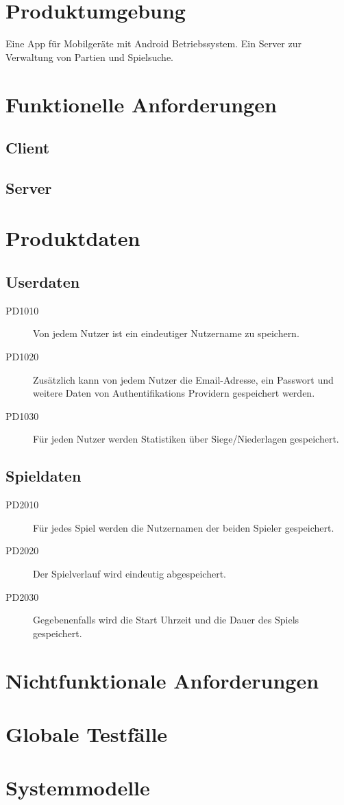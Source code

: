 \documentclass[parskip=full]{scrartcl}
\begin{document}
\section{Produktumgebung}
	\begin{description}
		Eine App für Mobilgeräte mit Android Betriebssystem.
		Ein Server zur Verwaltung von Partien und Spielsuche.		
	\end{description}
\section{Funktionelle Anforderungen}
\subsection{Client}
\subsection{Server}

\section{Produktdaten}

\subsection{Userdaten}
\begin{description}
	
\item[PD1010] Von jedem Nutzer ist ein eindeutiger Nutzername zu speichern.
\item[PD1020] Zusätzlich kann von jedem Nutzer die Email-Adresse, ein Passwort 	und weitere Daten von Authentifikations Providern gespeichert werden.
\item [PD1030] Für jeden Nutzer werden Statistiken über Siege/Niederlagen gespeichert.

\end{description}

\subsection{Spieldaten}
\begin{description}
	
\item[PD2010] Für jedes Spiel werden die Nutzernamen der beiden Spieler gespeichert.
\item[PD2020] Der Spielverlauf wird eindeutig abgespeichert.
\item[PD2030] Gegebenenfalls wird die Start Uhrzeit und die Dauer des Spiels gespeichert.

\end{description}

\section{Nichtfunktionale Anforderungen}
\section{Globale Testfälle}
\section{Systemmodelle}
\end{document}
